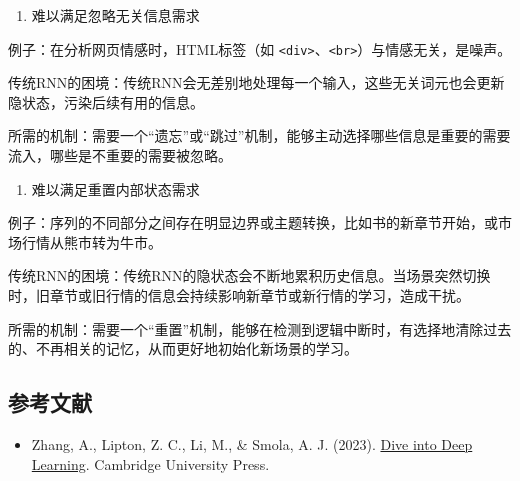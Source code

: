 \begin{enumerate}
\def\labelenumi{\arabic{enumi}.}
\setcounter{enumi}{2}
\tightlist
\item
  难以满足忽略无关信息需求
\end{enumerate}

例子：在分析网页情感时，HTML标签（如 \texttt{\textless{}div\textgreater{}}、\texttt{\textless{}br\textgreater{}}）与情感无关，是噪声。

传统RNN的困境：传统RNN会无差别地处理每一个输入，这些无关词元也会更新隐状态，污染后续有用的信息。

所需的机制：需要一个``遗忘''或``跳过''机制，能够主动选择哪些信息是重要的需要流入，哪些是不重要的需要被忽略。

\begin{enumerate}
\def\labelenumi{\arabic{enumi}.}
\setcounter{enumi}{3}
\tightlist
\item
  难以满足重置内部状态需求
\end{enumerate}

例子：序列的不同部分之间存在明显边界或主题转换，比如书的新章节开始，或市场行情从熊市转为牛市。

传统RNN的困境：传统RNN的隐状态会不断地累积历史信息。当场景突然切换时，旧章节或旧行情的信息会持续影响新章节或新行情的学习，造成干扰。

所需的机制：需要一个``重置''机制，能够在检测到逻辑中断时，有选择地清除过去的、不再相关的记忆，从而更好地初始化新场景的学习。

\FloatBarrier
{}
\hypertarget{ux53c2ux8003ux6587ux732e-18}{%
\subsection{参考文献}\label{ux53c2ux8003ux6587ux732e-18}}

\vspace{0.25em}
\begin{itemize}
\tightlist
\item
  Zhang, A., Lipton, Z. C., Li, M., \& Smola, A. J. (2023). \href{https://D2L.ai}{Dive into Deep Learning}. Cambridge University Press.
\end{itemize}

\clearpage
